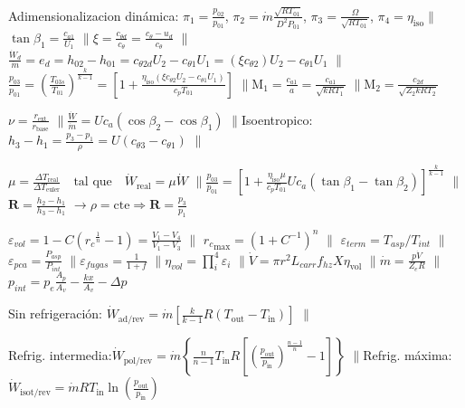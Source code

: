 \documentclass{article}
\newcommand{\substy}[2]{\ensuremath{{#1_{\mathrm{#2}}}}}
\newcommand{\cp}{c_p}
\newcommand{\gasconst}{k}
\newcommand{\ctegas}{\gasconst}
\newcommand{\speedsound}{a}
\newcommand{\ctan}[1]{\ensuremath{c_{\theta #1}}}
\newcommand{\cax}[1]{\ensuremath{c_{a #1}}}
\newcommand{\Mach}{\mathrm{M}}
\newcommand{\cte}{\textrm{cte}}
\newcommand{\etaiso}{\eta_{\mathrm{iso}}}
\newcommand{\dW}{\dot{W}}
\newcommand{\dm}{\dot{m}}
\newcommand{\etavol}{\substy{\eta}{vol}}
\newcommand{\slip}{\xi}
\newcommand{\radrel}{\nu}
\newcommand{\powerreduction}{\mu}
\newcommand{\degreeofreaction}{{\bm{R}}}
\newcommand{\relcomp}{{\ensuremath{r_{\!c}}}}
\newcommand{\epsi}{\varepsilon}
\newcommand{\dV}{\dot{V}}
\newcommand{\going}{\ensuremath{\rightarrow}}
\newcommand{\separar}{\ensuremath{\pmb{  \parallel{} }}}
\newcommand{\entrada}{\mathrm{in}}
\newcommand{\out}{\mathrm{out}}
\begin{document}
\vspace{\formuleoseparator}
\begin{formuleo}[Centrifugos] Adimensionalizacion dinámica: $\pi_{1}=\frac{p_{02}}{p_{01}}$, $\pi_{2}=\dot{m} \frac{\sqrt{R T_{01}}}{D^{2} P_{01}}$, $\pi_{3}=\frac{\Omega}{\sqrt{R T_{01}}}$, $\pi_{4}=\eta_{\mathrm{iso}}$\separar$\tan \beta_{1}=\frac{c_{a 1}}{U_{1}}$ \separar $\xi=\frac{c_{\theta d}}{c_{\theta}}=\frac{c_{\theta}-u_{d}}{c_{\theta}}$ \separar $\frac{\dW_d}{\dm}=e_d = h_{02}-h_{01}=\ctan{2d} U_2 - \ctan{1} U_1 = (\slip \ctan{2})U_2 - \ctan{1} U_1$ 
\separar $\frac{p_{03}}{p_{01}}= \left( \frac{T_{03s}}{T_{01}}\right)^{\frac{\ctegas}{\ctegas-1}} =\left[ 1+ \frac{\etaiso (\slip \ctan{2}U_2 - \ctan{1}U_1)}{\cp T_{01}} \right]$ \separar $\Mach_1 = \frac{\cax{1}}{\speedsound} = \frac{\cax{1}}{\sqrt{\ctegas R T_1}}$ \separar $\Mach_2 = \frac{c_{2d}}{\sqrt{Z_2\ctegas R T_2}}$

\end{formuleo}
\vspace{\formuleoseparator}
\begin{formuleo}[Axiales]
$\radrel = \frac{r_{\mathrm{ext}}}{r_{\mathrm{base}}}$ \separar $ \frac{\dW}{\dm} = U \cax{} (\cos\beta_2 - \cos\beta_1 )$ \separar Isoentropico: $h_3 - h_1 = \frac{p_3 -p_1}{\rho}=U (\ctan{3}-\ctan{1})$ \separar

$\powerreduction = \frac{\Delta \substy{T}{real}}{\Delta \substy{T}{euler}} \quad \text{tal que} \quad \substy{\dW}{real} = \powerreduction \dW$ \separar $\frac{p_{03}}{p_{01}} = \left[1 + \frac{\etaiso \powerreduction}{\cp T_{01}}U \cax{} (\tan \beta_1 - \tan \beta_2) \right]^{\frac{\ctegas}{\ctegas-1}}$ \separar $\degreeofreaction = \frac{h_2 - h_1}{h_3 - h_1}$ \going $\rho = \cte \Rightarrow \degreeofreaction = \frac{p_3}{p_1}$ 
\end{formuleo}
\vspace{\formuleoseparator}
\begin{formuleo}[Alternativos]
$\epsi_{vol}=1-C(\relcomp^{\frac{1}{n}} -1)=\frac{V_1 - V_4}{V_1 - V_3}$ \separar 
$\relcomp_{\max} = (1+C^{-1})^n$ \separar
$\epsi_{term}=T_{asp}/T_{int}$ \separar $\epsi_{pca}=\frac{P_{asp}}{P_{int}}$ \separar $ \epsi_{fugas} = \frac{1}{1+f}$ \separar$ \eta_{vol}=\prod_i^4 \epsi_i$ \separar $\dV = \pi r^2 L_{carr} f_{hz} X \etavol$ \separar $\dm = \frac{p \dV}{Z_e R}$ \separar $p_{int} = p_e \frac{A_p}{A_v}-\frac{kx}{A_v}-\Delta p$
\end{formuleo}
\vspace{\formuleoseparator}
\begin{formuleo}[Refrigeración]
Sin refrigeración: $\dW_{\mathrm{ad/rev}} = \dm \left[\frac{k}{k-1}R(T_{\out}-T_{\entrada}) \right]$ \separar 

Refrig. intermedia:$\dW_{\mathrm{pol/rev}}=\dm \left\{ \frac{n}{n-1} T_{\entrada} R \left[ \left(\frac{p_\out}{p_\entrada}\right)^{\frac{n-1}{n}} -1\right] \right\}$ \separar Refrig. máxima: $\dW_{\mathrm{isot/rev}}=\dm R T_\entrada \ln(\frac{p_\out}{p_\entrada})$
\end{formuleo}
\end{document}
